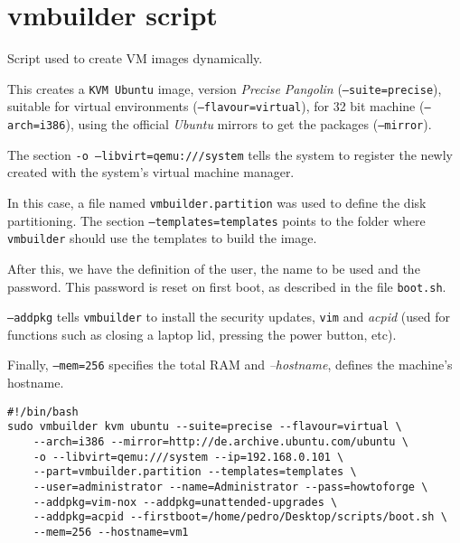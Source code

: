 \chapter{vmbuilder script} \label{chap:ap4}

Script used to create VM images dynamically.

This creates a \texttt{KVM Ubuntu} image, version \textit{Precise Pangolin} (\texttt{--suite=precise}), suitable for virtual environments (\texttt{--flavour=virtual}), for 32 bit machine (\texttt{--arch=i386}), using the official \textit{Ubuntu} mirrors to get the packages (\texttt{--mirror}).

The section \texttt{-o --libvirt=qemu:///system} tells the system to register the newly created with the system's virtual machine manager.

In this case, a file named \texttt{vmbuilder.partition} was used to define the disk partitioning. The section \texttt{--templates=templates} points to the folder where \texttt{vmbuilder} should use the templates to build the image. 

After this, we have the definition of the user, the name to be used and the password. This password is reset on first boot, as described in the file \texttt{boot.sh}.

\texttt{--addpkg} tells \texttt{vmbuilder} to install the security updates, \texttt{vim} and \textit{acpid} (used for functions such as closing a laptop lid, pressing the power button, etc).

Finally, \texttt{--mem=256} specifies the total RAM and \textit{--hostname}, defines the machine's hostname.
\begin{verbatim}
#!/bin/bash
sudo vmbuilder kvm ubuntu --suite=precise --flavour=virtual \
	--arch=i386 --mirror=http://de.archive.ubuntu.com/ubuntu \
	-o --libvirt=qemu:///system --ip=192.168.0.101 \
	--part=vmbuilder.partition --templates=templates \
	--user=administrator --name=Administrator --pass=howtoforge \
	--addpkg=vim-nox --addpkg=unattended-upgrades \
	--addpkg=acpid --firstboot=/home/pedro/Desktop/scripts/boot.sh \
	--mem=256 --hostname=vm1 
\end{verbatim}
